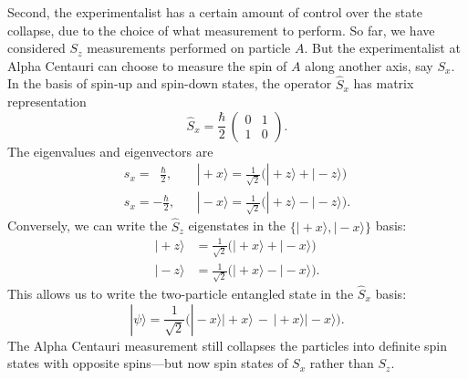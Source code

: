 \documentclass[pra,12pt]{revtex4}
\begin{document}
Second, the experimentalist has a certain amount of control over the
state collapse, due to the choice of what measurement to perform.  So
far, we have considered $S_z$ measurements performed on particle $A$.
But the experimentalist at Alpha Centauri can choose to measure the
spin of $A$ along another axis, say $S_x$.  In the basis of spin-up
and spin-down states, the operator $\hat{S}_x$ has matrix
representation
$$\hat{S}_x = \frac{\hbar}{2}\, \begin{pmatrix}0&1\\1&0\end{pmatrix}.$$
The eigenvalues and eigenvectors are
$$\begin{aligned}s_x = \;\;\frac{\hbar}{2},\; &\;\;\; |\!+\!x\rangle = \frac{1}{\sqrt{2}}\Big(|\!+\!z\rangle + |\!-\!z\rangle\Big) \\ s_x = -\frac{\hbar}{2}, &\;\;\; |\!-\!x\rangle = \frac{1}{\sqrt{2}}\Big(|\!+\!z\rangle - |\!-\!z\rangle\Big).\end{aligned}$$
Conversely, we can write the $\hat{S}_z$ eigenstates in the $\{|\!+\!x\rangle,|\!-\!x\rangle\}$ basis:
$$\begin{aligned}|\!+\!z\rangle &= \frac{1}{\sqrt{2}}\Big(|\!+\!x\rangle + |\!-\!x\rangle\Big) \\ |\!-\!z\rangle &= \frac{1}{\sqrt{2}}\Big(|\!+\!x\rangle - |\!-\!x\rangle\Big).\end{aligned}$$
This allows us to write the two-particle entangled state in the
$\hat{S}_x$ basis:
$$|\psi\rangle = \frac{1}{\sqrt{2}} \Big(|\!-\!x\rangle|\!+\!x\rangle \,-\, |\!+\!x\rangle|\!-\!x\rangle\Big).$$
The Alpha Centauri measurement still collapses the particles into
definite spin states with opposite spins---but now spin states of
${S}_x$ rather than ${S}_z$.
\end{document}
